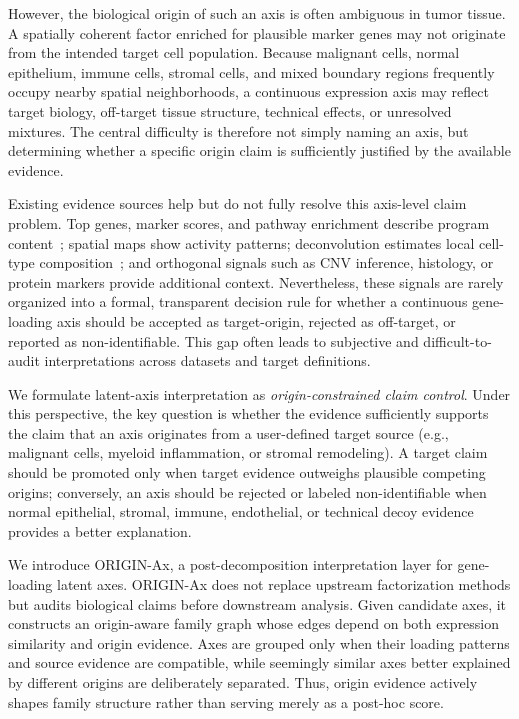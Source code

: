 \documentclass[conference]{IEEEtran}
\begin{document}
However, the biological origin of such an axis is often ambiguous in tumor tissue. A spatially coherent factor enriched for plausible marker genes may not originate from the intended target cell population. Because malignant cells, normal epithelium, immune cells, stromal cells, and mixed boundary regions frequently occupy nearby spatial neighborhoods, a continuous expression axis may reflect target biology, off-target tissue structure, technical effects, or unresolved mixtures. The central difficulty is therefore not simply naming an axis, but determining whether a specific origin claim is sufficiently justified by the available evidence.

Existing evidence sources help but do not fully resolve this axis-level claim problem. Top genes, marker scores, and pathway enrichment describe program content~\cite{subramanian2005gsea,zhang2019cellmarker}; spatial maps show activity patterns; deconvolution estimates local cell-type composition~\cite{kleshchevnikov2022cell2location,cable2022rctd}; and orthogonal signals such as CNV inference, histology, or protein markers provide additional context. Nevertheless, these signals are rarely organized into a formal, transparent decision rule for whether a continuous gene-loading axis should be accepted as target-origin, rejected as off-target, or reported as non-identifiable. This gap often leads to subjective and difficult-to-audit interpretations across datasets and target definitions.

We formulate latent-axis interpretation as \emph{origin-constrained claim control}. Under this perspective, the key question is whether the evidence sufficiently supports the claim that an axis originates from a user-defined target source (e.g., malignant cells, myeloid inflammation, or stromal remodeling). A target claim should be promoted only when target evidence outweighs plausible competing origins; conversely, an axis should be rejected or labeled non-identifiable when normal epithelial, stromal, immune, endothelial, or technical decoy evidence provides a better explanation.

We introduce ORIGIN-Ax, a post-decomposition interpretation layer for gene-loading latent axes. ORIGIN-Ax does not replace upstream factorization methods but audits biological claims before downstream analysis. Given candidate axes, it constructs an origin-aware family graph whose edges depend on both expression similarity and origin evidence. Axes are grouped only when their loading patterns and source evidence are compatible, while seemingly similar axes better explained by different origins are deliberately separated. Thus, origin evidence actively shapes family structure rather than serving merely as a post-hoc score.
\end{document}
